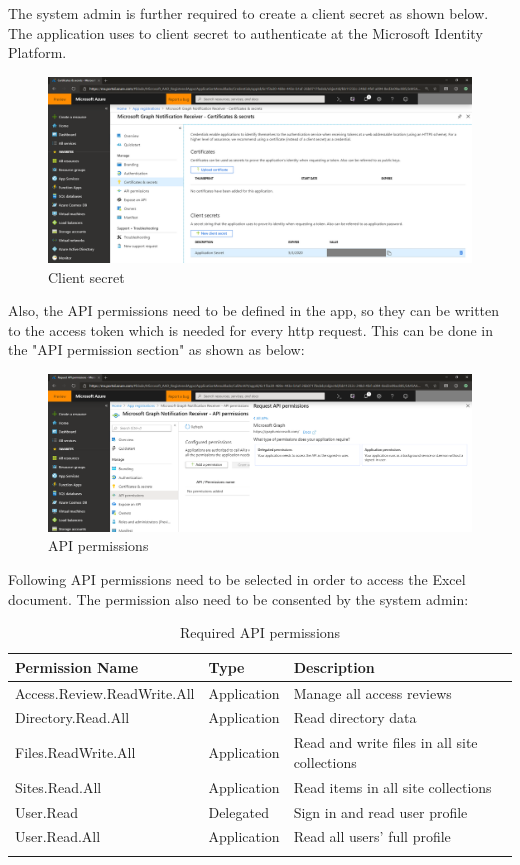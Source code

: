 The system admin is further required to create a client secret as shown below. The application uses to client secret to authenticate at the Microsoft Identity Platform.

\begin{figure}[h!]
  \includegraphics[scale=0.275]{Figures/client-secret.png}
  \caption{Client secret}
  \label{fig:Creation of client secret}
\end{figure}

Also, the API permissions need to be defined in the app, so they can be written to the access token which is needed for every http request. This can be done in the "API permission section" as shown as below:

\begin{figure}[h!]
  \includegraphics[scale=0.275]{Figures/notifications-api-permissions.png}
  \caption{API permissions}
  \label{fig: Adding API permissions}
\end{figure}

Following API permissions need to be selected in order to access the Excel document. The permission also need to be consented by the system admin:


\begin{longtable}[]{@{}lll@{}}
\toprule
Permission Name & Type & Description\tabularnewline
\midrule
\endhead
Access.Review.ReadWrite.All & Application & Manage all access reviews\tabularnewline
Directory.Read.All & Application & Read directory data\tabularnewline
Files.ReadWrite.All & Application & Read and write files in all site collections\tabularnewline
Sites.Read.All & Application & Read items in all site collections\tabularnewline
User.Read & Delegated & Sign in and read user profile\tabularnewline
User.Read.All & Application & Read all users' full profile\tabularnewline
\bottomrule
\caption{Required API permissions}
\label{Required API permissions}
\end{longtable}

